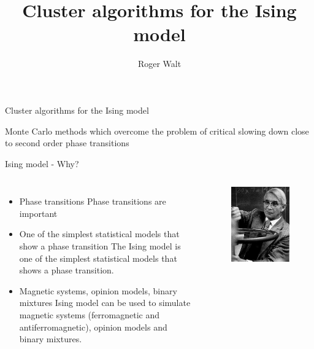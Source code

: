 \documentclass[handout]{beamer}
\begin{document}
\title{Cluster algorithms for the Ising model}
\author{Roger Walt}

\begin{frame}
	\huge{Cluster algorithms for the Ising model}
	\vspace*{5pt}

	\Large{Monte Carlo methods which overcome the problem of critical slowing down close to second order phase transitions}
\end{frame}

\begin{frame}{Ising model - Why?}
\begin{columns}[c]
	\begin{itemize}
		\item<1-> Phase transitions
			 {Phase transitions are important}
		\item<2-> One of the simplest statistical models that show a phase transition
			 {The Ising model is one of the simplest statistical models that shows a phase transition.}
		\item<3-> Magnetic systems, opinion models, binary mixtures
			 {Ising model can be used to simulate magnetic systems (ferromagnetic and antiferromagnetic), opinion models and binary mixtures.}
	\end{itemize}
	\pause[4]
	\begin{figure}[p]
		\centering
		\includegraphics{img/ising.jpg}

\end{figure}
\end{columns}
\end{frame}
\end{document}
